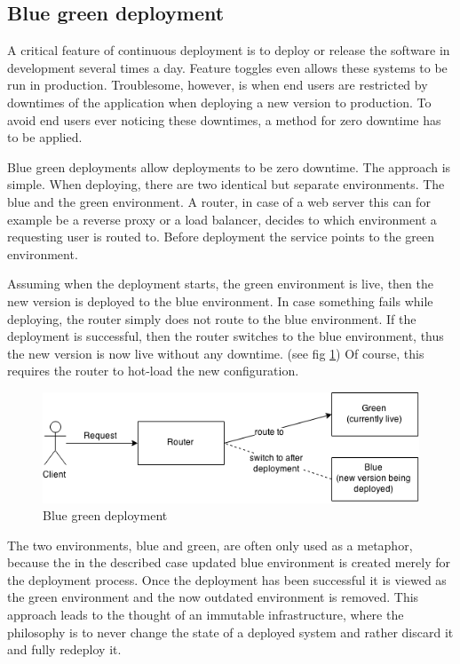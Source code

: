 \subsection{Blue green deployment}

A critical feature of continuous deployment is to deploy or release the
software in development several times a day. Feature toggles even allows
these systems to be run in production. Troublesome, however, is when end users
are restricted by downtimes of the application when deploying a new version to
production. To avoid end users ever noticing these downtimes, a method for zero
downtime has to be applied.

Blue green deployments allow deployments to be zero downtime. The approach is
simple. When deploying, there are two identical but separate environments. The
blue and the green environment. A router, in case of a web server this can for
example be a reverse proxy or a load balancer, decides to which environment a
requesting user is routed to. Before deployment the service points to the green
environment.

Assuming when the deployment starts, the green environment is live, then the
new version is deployed to the blue environment. In case something fails while
deploying, the router simply does not route to the blue environment. If the
deployment is successful, then the router switches to the blue environment,
thus the new version is now live without any downtime. (see fig
\ref{fig:blue_green_deployment}) Of course, this requires the router to hot-load the
new configuration.

\begin{figure}
  \includegraphics[scale=0.55]{pictures/blue_green_deployment.png}
  \caption{Blue green deployment}
  \centering
  \label{fig:blue_green_deployment}
\end{figure}

The two environments, blue and green, are often only used as a metaphor,
because the in the described case updated blue environment is created merely
for the deployment process. Once the deployment has been successful it is
viewed as the green environment and the now outdated environment is removed.
This approach leads to the thought of an immutable infrastructure, where the
philosophy is to never change the state of a deployed system and rather discard
it and fully redeploy it.

